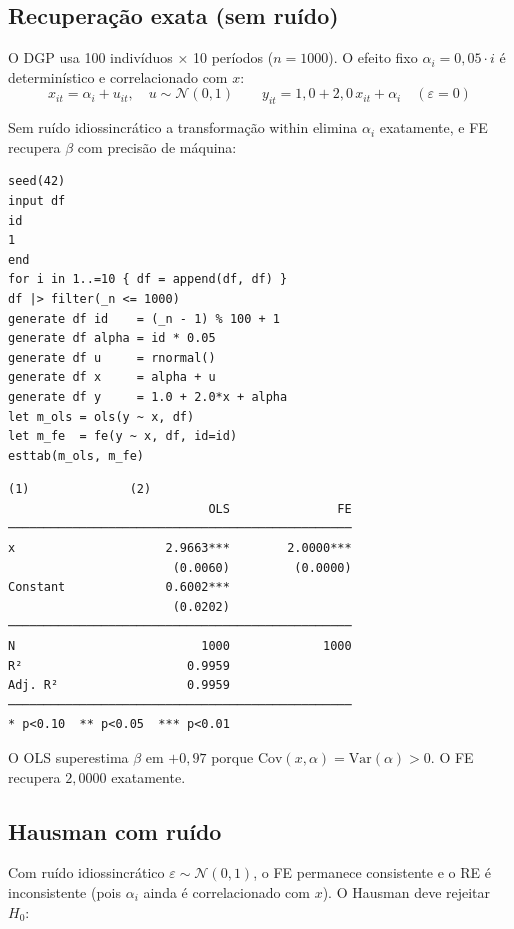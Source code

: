 \subsection*{Recuperação exata (sem ruído)}

O DGP usa 100 indivíduos × 10 períodos ($n = 1000$). O efeito fixo
$\alpha_i = 0{,}05\cdot i$ é determinístico e correlacionado com $x$:
\[
  x_{it} = \alpha_i + u_{it},\quad u \sim \mathcal{N}(0,1)
  \qquad
  y_{it} = 1{,}0 + 2{,}0\,x_{it} + \alpha_i \quad(\varepsilon = 0)
\]

Sem ruído idiossincrático a transformação within elimina $\alpha_i$
exatamente, e FE recupera $\beta$ com precisão de máquina:

\begin{lstlisting}[caption={FE com efeito fixo correlacionado — sem ruído}]
seed(42)
input df
id
1
end
for i in 1..=10 { df = append(df, df) }
df |> filter(_n <= 1000)
generate df id    = (_n - 1) % 100 + 1
generate df alpha = id * 0.05
generate df u     = rnormal()
generate df x     = alpha + u
generate df y     = 1.0 + 2.0*x + alpha
let m_ols = ols(y ~ x, df)
let m_fe  = fe(y ~ x, df, id=id)
esttab(m_ols, m_fe)
\end{lstlisting}

\begin{lstlisting}[language={}, basicstyle=\ttfamily\small,
  frame=none, numbers=none, backgroundcolor=\color{codbg},
  xleftmargin=0pt, xrightmargin=0pt, breaklines=false]
                            (1)              (2)
                            OLS               FE
────────────────────────────────────────────────
x                     2.9663***        2.0000***
                       (0.0060)         (0.0000)
Constant              0.6002***
                       (0.0202)
────────────────────────────────────────────────
N                          1000             1000
R²                       0.9959
Adj. R²                  0.9959
────────────────────────────────────────────────
* p<0.10  ** p<0.05  *** p<0.01
\end{lstlisting}

O OLS superestima $\beta$ em $+0{,}97$ porque $\mathrm{Cov}(x,\alpha) =
\mathrm{Var}(\alpha) > 0$. O FE recupera $2{,}0000$ exatamente.

\subsection*{Hausman com ruído}

Com ruído idiossincrático $\varepsilon \sim \mathcal{N}(0,1)$, o FE permanece
consistente e o RE é inconsistente (pois $\alpha_i$ ainda é correlacionado
com $x$). O Hausman deve rejeitar $H_0$:

